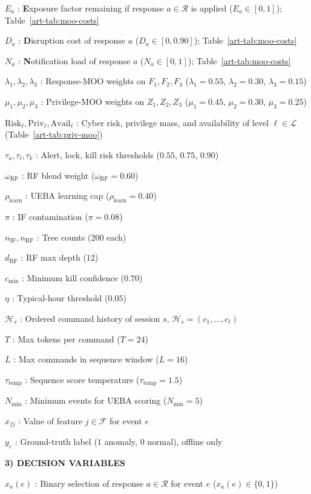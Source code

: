 $E_a$ : \textbf{E}xposure factor remaining if response $a\in\mathcal{R}$ is applied ($E_a\in[0,1]$); Table~\ref{art-tab:moo-costs}

$D_a$ : \textbf{D}isruption cost of response $a$ ($D_a\in[0,0.90]$); Table~\ref{art-tab:moo-costs}

$N_a$ : \textbf{N}otification load of response $a$ ($N_a\in[0,1]$); Table~\ref{art-tab:moo-costs}

$\lambda_1,\lambda_2,\lambda_3$ : Response-MOO weights on $F_1,F_2,F_3$ ($\lambda_1{=}0.55$, $\lambda_2{=}0.30$, $\lambda_3{=}0.15$)

$\mu_1,\mu_2,\mu_3$ : Privilege-MOO weights on $Z_1,Z_2,Z_3$ ($\mu_1{=}0.45$, $\mu_2{=}0.30$, $\mu_3{=}0.25$)

$\mathrm{Risk}_{\ell},\mathrm{Priv}_{\ell},\mathrm{Avail}_{\ell}$ : Cyber risk, privilege mass, and availability of level $\ell\in\mathcal{L}$ (Table~\ref{art-tab:priv-moo})

$\tau_a,\tau_l,\tau_k$ : Alert, lock, kill risk thresholds ($0.55$, $0.75$, $0.90$)

$\omega_{\mathrm{RF}}$ : RF blend weight ($\omega_{\mathrm{RF}}=0.60$)

$\rho_{\mathrm{learn}}$ : UEBA learning cap ($\rho_{\mathrm{learn}}=0.40$)

$\pi$ : IF contamination ($\pi=0.08$)

$n_{\mathrm{IF}},n_{\mathrm{RF}}$ : Tree counts ($200$ each)

$d_{\mathrm{RF}}$ : RF max depth ($12$)

$c_{\min}$ : Minimum kill confidence ($0.70$)

$\eta$ : Typical-hour threshold ($0.05$)

$\mathcal{H}_s$ : Ordered command history of session $s$, $\mathcal{H}_s=(c_1,\ldots,c_t)$

$T$ : Max tokens per command ($T{=}24$)

$L$ : Max commands in sequence window ($L{=}16$)

$\tau_{\mathrm{temp}}$ : Sequence score temperature ($\tau_{\mathrm{temp}}{=}1.5$)

$N_{\min}$ : Minimum events for UEBA scoring ($N_{\min}=5$)

$x_{fj}$ : Value of feature $j\in\mathcal{F}$ for event $e$

$y_e$ : Ground-truth label ($1$ anomaly, $0$ normal), offline only

\textbf{3) DECISION VARIABLES}

$x_a(e)$ : Binary selection of response $a\in\mathcal{R}$ for event $e$ ($x_a(e)\in\{0,1\}$)

